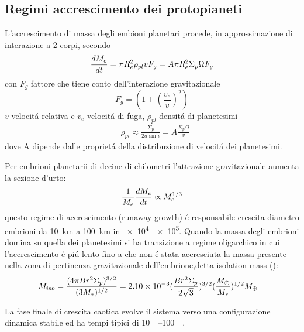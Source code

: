 \begin{reworking}
	\subsection{Regimi accrescimento dei protopianeti}
	
	L'accrescimento di massa degli embioni planetari procede, in approssimazione di interazione a 2 corpi, secondo
	\begin{equation}
	\TDy{t}{M_e}=\pi R_e^2\rho_{pl}v F_g=A\pi R_e^2\Sigma_p\Omega F_g\label{eq:Gaccretionpl}
	\end{equation}
	con $F_g$ fattore che tiene conto dell'interazione gravitazionale
	\begin{equation}
	F_g=(1+(\frac{v_e}{v})^2)
	\end{equation}
	$v$ velocit\'a relativa e $v_e$ velocit\'a di fuga, $\rho_{pl}$ densit\'a di planetesimi
	\begin{align}
	&\rho_{pl}\approx\frac{\Sigma_p}{2a\sin{i}}=A\frac{\Sigma_p\Omega}{v}
	\end{align}
	dove A dipende dalle propriet\'a della distribuzione di velocit\'a dei planetesimi.
	
	Per embrioni planetarii di decine di chilometri l'attrazione gravitazionale aumenta la sezione d'urto: 
	\begin{equation}
	\frac{1}{M_e}\TDy{t}{M_e}\propto M_e\expy{1/3}
	\end{equation}
	questo regime di accrescimento (runaway growth) \'e responsabile crescita diametro embrioni da \SI{10}{\kilo\meter} a \SI{100}{\kilo\meter} in \SIrange{e4}{e5}{\year}.
	Quando la massa degli embrioni domina su quella dei planetesimi si ha transizione a regime oligarchico in cui l'accrescimento \'e pi\'u lento fino a che non \'e stata accresciuta la massa presente nella zona di pertinenza gravitazionale dell'embrione,detta isolation mass (\cite{lissauer1993planet}):
	\begin{align}
	&M_{iso}=\frac{(4\pi Br^2\Sigma_p)\expy{3/2}}{(3M_*)\expy{1/2}}=\num{2.10e-3}(\frac{Br^2\Sigma_p}{2\sqrt{3}})\expy{3/2}(\frac{\msun{}}{M_*})\expy{1/2}\mearth{}
	\end{align}
	
	La fase finale di crescita caotica evolve il sistema verso una configurazione dinamica stabile ed ha tempi tipici di \SIrange{10}{100}{\mega\year}.
	
\end{reworking}

